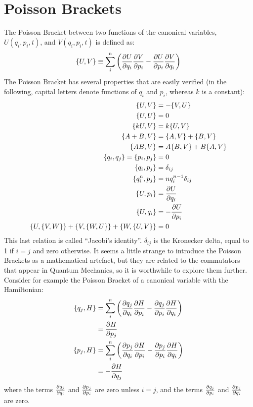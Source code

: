 \section{Poisson Brackets}
The Poisson Bracket between two functions of the canonical variables, $U(q_i,p_i,t)$, and $V(q_i, p_i, t)$ is defined as:
\begin{align}
\{U,V\}\equiv\sum_i^n\left(\frac{\partial U}{\partial q_i}\frac{\partial V}{\partial p_i}-\frac{\partial U}{\partial p_i}\frac{\partial V}{\partial q_i}\right)
\end{align}
The Poisson Bracket has several properties that are easily verified (in the following, capital letters denote functions of $q_i$ and $p_i$, whereas $k$ is a constant):
\begin{align}
\{U,V\}&=-\{V,U\}\nonumber\\
\{U,U\}&=0\nonumber\\
\{kU,V\}&=k\{U,V\}\nonumber\\
\{A+B,V\}&=\{A,V\}+\{B,V\}\nonumber\\
\{AB,V\}&=A\{B,V\}+B\{A,V\}\nonumber\\
\{q_i,q_j\}=\{p_i,p_j\}&=0\nonumber\\
\{q_i,p_j\}&=\delta_{ij}\nonumber\\
\{q_i^n,p_j\}&=nq_i^{n-1}\delta_{ij}\nonumber\\
\{U,p_i\}&=\frac{\partial U}{\partial q_i}\nonumber\\
\{U,q_i\}&=-\frac{\partial U}{\partial p_i}\nonumber\\
\{U,\{V,W\}\}+\{V,\{W,U\}\}+\{W,\{U,V\}\}&=0
\label{eqn:PBprops}
\end{align}
This last relation is called ``Jacobi's identity''. $\delta_{ij}$ is the Kronecker delta, equal to 1 if $i=j$ and zero otherwise. It seems a little strange to introduce the Poisson Brackets as a mathematical artefact, but they are related to the commutators that appear in Quantum Mechanics, so it is worthwhile to explore them further. Consider for example the Poisson Bracket of a canonical variable with the Hamiltonian:
\begin{align}
\{q_j,H\}&=\sum_i^n\left(\frac{\partial q_j}{\partial q_i}\frac{\partial H}{\partial p_i}-\frac{\partial q_j}{\partial p_i}\frac{\partial H}{\partial q_i}\right)\nonumber\\
&=\frac{\partial H}{\partial p_j}\nonumber\\
\{p_j,H\}&=\sum_i^n\left(\frac{\partial p_j}{\partial q_i}\frac{\partial H}{\partial p_i}-\frac{\partial p_j}{\partial p_i}\frac{\partial H}{\partial q_i}\right)\nonumber\\
&=-\frac{\partial H}{\partial q_j}\nonumber
\end{align}
where the terms $\frac{\partial q_j}{\partial q_i}$ and $\frac{\partial p_j}{\partial p_i}$ are zero unless $i=j$, and the terms $\frac{\partial q_j}{\partial p_i}$ and $\frac{\partial p_j}{\partial q_i}$ are zero.
